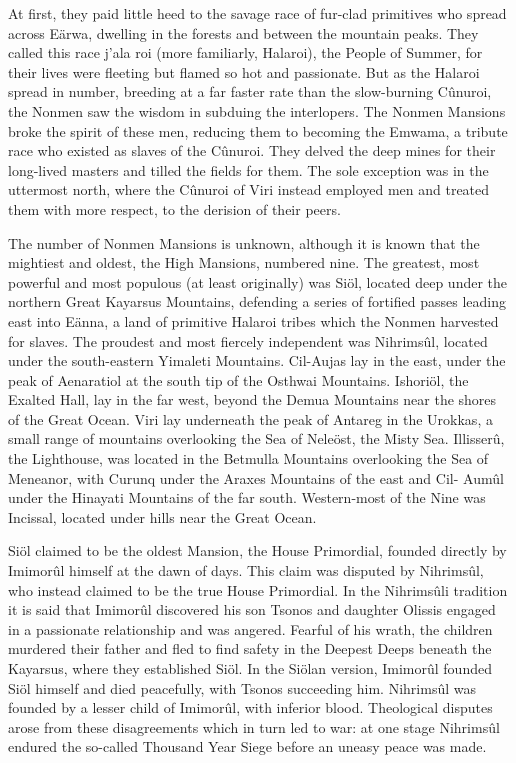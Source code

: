 \documentclass[]{book}
\begin{document}
At first, they paid little heed to the savage race of fur-clad primitives who spread across
Eärwa, dwelling in the forests and between the mountain peaks. They called this race
j'ala roi (more familiarly, Halaroi), the People of Summer, for their lives were fleeting
but flamed so hot and passionate. But as the Halaroi spread in number, breeding at a
far faster rate than the slow-burning Cûnuroi, the Nonmen saw the wisdom in
subduing the interlopers. The Nonmen Mansions broke the spirit of these men,
reducing them to becoming the Emwama, a tribute race who existed as slaves of the
Cûnuroi. They delved the deep mines for their long-lived masters and tilled the fields
for them. The sole exception was in the uttermost north, where the Cûnuroi of Viri
instead employed men and treated them with more respect, to the derision of their
peers.

The number of Nonmen Mansions is unknown, although it is known that the
mightiest and oldest, the High Mansions, numbered nine. The greatest, most powerful
and most populous (at least originally) was Siöl, located deep under the northern Great
Kayarsus Mountains, defending a series of fortified passes leading east into Eänna, a
land of primitive Halaroi tribes which the Nonmen harvested for slaves. The proudest
and most fiercely independent was Nihrimsûl, located under the south-eastern Yimaleti
Mountains. Cil-Aujas lay in the east, under the peak of Aenaratiol at the south tip of
the Osthwai Mountains. Ishoriöl, the Exalted Hall, lay in the far west, beyond the
Demua Mountains near the shores of the Great Ocean. Viri lay underneath the peak of
Antareg in the Urokkas, a small range of mountains overlooking the Sea of Neleöst, the
Misty Sea. Illisserû, the Lighthouse, was located in the Betmulla Mountains overlooking
the Sea of Meneanor, with Curunq under the Araxes Mountains of the east and Cil-
Aumûl under the Hinayati Mountains of the far south. Western-most of the Nine was
Incissal, located under hills near the Great Ocean.

Siöl claimed to be the oldest Mansion, the House Primordial, founded directly by
Imimorûl himself at the dawn of days. This claim was disputed by Nihrimsûl, who
instead claimed to be the true House Primordial. In the Nihrimsûli tradition it is said
that Imimorûl discovered his son Tsonos and daughter Olissis engaged in a passionate
relationship and was angered. Fearful of his wrath, the children murdered their father
and fled to find safety in the Deepest Deeps beneath the Kayarsus, where they
established Siöl. In the Siölan version, Imimorûl founded Siöl himself and died
peacefully, with Tsonos succeeding him. Nihrimsûl was founded by a lesser child of
Imimorûl, with inferior blood. Theological disputes arose from these disagreements
which in turn led to war: at one stage Nihrimsûl endured the so-called Thousand Year
Siege before an uneasy peace was made.
\end{document}
